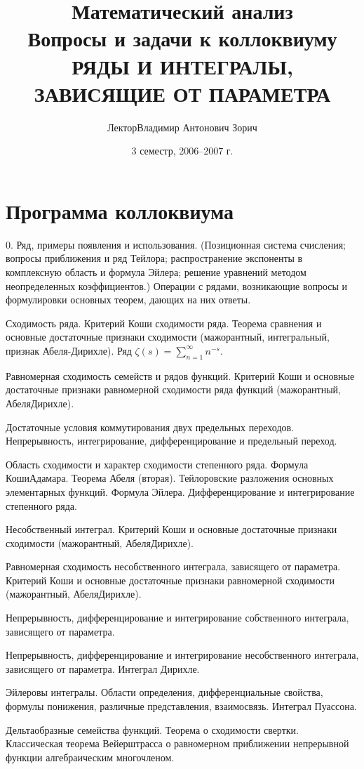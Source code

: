 \documentclass[a4paper]{article}
\title{Математический анализ\\
Вопросы и задачи к коллоквиуму\\
РЯДЫ И ИНТЕГРАЛЫ, ЗАВИСЯЩИЕ ОТ ПАРАМЕТРА}
\author{Лектор\т Владимир Антонович Зорич}
\date{3 семестр, 2006--2007 г.}
\begin{document}
\maketitle

\section*{Программа коллоквиума}

\begin{nums}{-2}
  \item[0.] Ряд, примеры появления и использования.
  (Позиционная система счисления; вопросы приближения
  и ряд Тейлора; распространение экспоненты в комплексную
  область и формула Эйлера; решение уравнений методом
  неопределенных коэффициентов.) Операции с рядами,
  возникающие вопросы и формулировки основных теорем,
  дающих на них ответы.
  \item Сходимость ряда. Критерий Коши сходимости ряда.
  Теорема сравнения и основные достаточные признаки
  сходимости (мажорантный, интегральный, признак
  Абеля-Дирихле). Ряд $\zeta(s)=\sum\limits_{n=1}^{\infty}n^{-s}$.
  \item Равномерная сходимость семейств и рядов функций. Критерий
  Коши и основные достаточные признаки равномерной сходимости ряда
  функций (мажорантный, Абеля\ч Дирихле).
  \item Достаточные условия коммутирования двух предельных
  переходов. Непрерывность, интегрирование, дифференцирование и
  предельный переход.
  \item Область сходимости и характер сходимости степенного ряда.
  Формула Коши\ч Адамара. Теорема Абеля (вторая). Тейлоровские
  разложения основных элементарных функций. Формула Эйлера.
  Дифференцирование и интегрирование степенного ряда.
  \item Несобственный интеграл. Критерий Коши и основные достаточные
  признаки сходимости (мажорантный, Абеля\ч Дирихле).
  \item Равномерная сходимость несобственного интеграла, зависящего
  от параметра. Критерий Коши и основные достаточные признаки
  равномерной сходимости (мажорантный, Абеля\ч Дирихле).
  \item Непрерывность, дифференцирование и интегрирование
  собственного интеграла, зависящего от параметра.
  \item Непрерывность, дифференцирование и интегрирование
  несобственного интеграла, зависящего от параметра. Интеграл
  Дирихле.
  \item Эйлеровы интегралы. Области определения, дифференциальные
  свойства, формулы понижения, различные представления, взаимосвязь.
  Интеграл Пуассона.
  \item Дельтаобразные семейства функций. Теорема о сходимости
  свертки. Классическая теорема Вейерштрасса о равномерном
  приближении непрерывной функции алгебраическим многочленом.
\end{nums}
\end{document}

